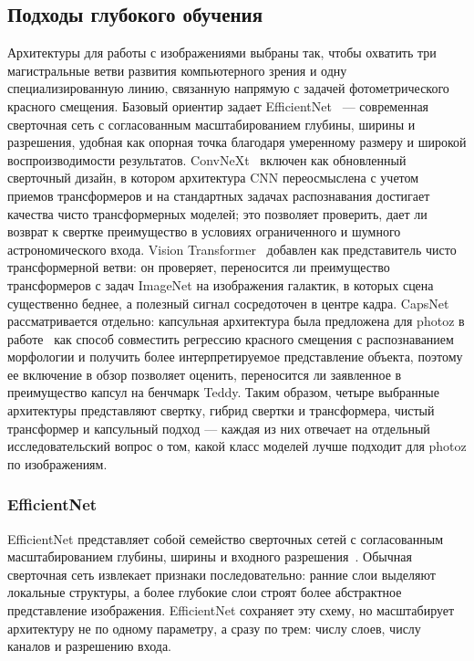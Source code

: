 \documentclass[12pt,a4paper]{article}
\begin{document}
\subsection{Подходы глубокого обучения}

Архитектуры для работы с изображениями выбраны так, чтобы охватить три магистральные ветви развития компьютерного зрения и одну специализированную линию, связанную напрямую с задачей фотометрического красного смещения. Базовый ориентир задает EfficientNet~\cite{tan2019efficientnet} — современная сверточная сеть с согласованным масштабированием глубины, ширины и разрешения, удобная как опорная точка благодаря умеренному размеру и широкой воспроизводимости результатов. ConvNeXt~\cite{liu2022convnext} включен как обновленный сверточный дизайн, в котором архитектура CNN переосмыслена с учетом приемов трансформеров и на стандартных задачах распознавания достигает качества чисто трансформерных моделей; это позволяет проверить, дает ли возврат к свертке преимущество в условиях ограниченного и шумного астрономического входа. Vision Transformer~\cite{dosovitskiy2020vit} добавлен как представитель чисто трансформерной ветви: он проверяет, переносится ли преимущество трансформеров с задач ImageNet на изображения галактик, в которых сцена существенно беднее, а полезный сигнал сосредоточен в центре кадра. CapsNet рассматривается отдельно: капсульная архитектура была предложена для photoz в работе~\cite{dey2022} как способ совместить регрессию красного смещения с распознаванием морфологии и получить более интерпретируемое представление объекта, поэтому ее включение в обзор позволяет оценить, переносится ли заявленное в~\cite{dey2022} преимущество капсул на бенчмарк Teddy. Таким образом, четыре выбранные архитектуры представляют свертку, гибрид свертки и трансформера, чистый трансформер и капсульный подход — каждая из них отвечает на отдельный исследовательский вопрос о том, какой класс моделей лучше подходит для photoz по изображениям.

\subsubsection{EfficientNet}

EfficientNet представляет собой семейство сверточных сетей с согласованным масштабированием глубины, ширины и входного разрешения~\cite{tan2019efficientnet}. Обычная сверточная сеть извлекает признаки последовательно: ранние слои выделяют локальные структуры, а более глубокие слои строят более абстрактное представление изображения. EfficientNet сохраняет эту схему, но масштабирует архитектуру не по одному параметру, а сразу по трем: числу слоев, числу каналов и разрешению входа.
\end{document}
